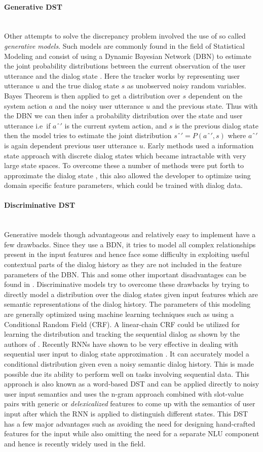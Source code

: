 \documentclass[14pt]{extarticle}
\newcommand{\myparagraph}[1]{\paragraph{#1}\mbox{}\\ \linebreak}
\numberwithin{equation}{section}
\begin{document}
  	\myparagraph{Generative DST}
	Other attempts to solve the discrepancy problem involved the use of so called \textit{generative models}. Such models are commonly found in the field of Statistical Modeling and consist of using a Dynamic Bayesian Network (DBN) to estimate the joint probability distributions between the current observation of the user utterance and the dialog state \cite{Young_dst_dbn}. Here the tracker works by representing user utterance $u$ and the true dialog state $s$ as unobserved noisy random variables. Bayes Theorem is then applied to get a distribution over $s$ dependent on the system action $a$ and the noisy user utterance $u$ and the previous state. Thus with the DBN we can then infer a probability distribution over the state and user utterance i.e\ if $aˆ'$ is the current system action, and $s$ is the previous dialog state then the model tries to estimate the joint distribution $sˆ' = P(aˆ',s)$ where $aˆ'$ is again dependent previous user utterance $u$. Early methods used a information state approach with discrete dialog states\cite{roy2000spoken} which became intractable with very large state spaces. To overcome these a number of methods were put forth to approximate the dialog state \cite{Henderson:2008:MMP:1557690.1557710}\cite{Young:2010:HIS:1621140.1621240}, this also allowed the developer to optimize using domain specific feature parameters, which could be trained with dialog data.
  	\myparagraph{Discriminative DST}	
	Generative models though advantageous and relatively easy to implement have a few drawbacks. Since they use a BDN, it tries to model all complex relationships present in the input features and hence face some difficulty in exploiting useful contextual parts of the dialog history as they are not included in the feature parameters of the DBN. This and some other important disadvantages can be found in \cite{generative_dst_limitation}. Discriminative models try to overcome these drawbacks by trying to directly model a distribution over the dialog states given input features which are semantic representations of the dialog history. The parameters of this modeling are generally optimized using machine learning techniques such as using a Conditional Random Field (CRF). A linear-chain CRF could be utilized for learning the distribution and tracking the sequential dialog as shown by the authors of \cite{Lee2013StructuredDM}. Recently RNNs have shown to be very effective in dealing with sequential user input to dialog state approximation \cite{Henderson2014WordBasedDS}\cite{Henderson_dst_2014}. It can accurately model a conditional distribution given even a noisy semantic dialog history. This is made possible due its ability to perform well on tasks involving sequential data. This approach is also known as a word-based DST and can be applied directly to noisy user input semantics and uses the n-gram approach combined with slot-value pairs with generic or \textit{delexicalized} features to come up with the semantics of user input after which the RNN is applied to distinguish different states\cite{DBLP:journals/corr/MrksicSWTY16}. This DST has a few major advantages such as avoiding the need for designing hand-crafted features for the input while also omitting the need for a separate NLU component and hence is recently widely used in the field.
\end{document}
